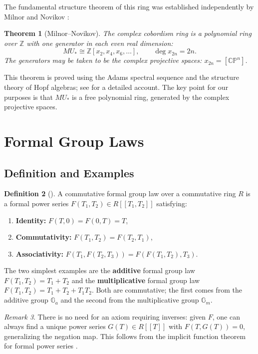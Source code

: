 \documentclass[12pt]{article}
\newtheorem{theorem}{Theorem}[section]
\theoremstyle{definition}
\newtheorem{definition}[theorem]{Definition}
\theoremstyle{remark}
\newtheorem{remark}[theorem]{Remark}
\newcommand{\Z}{\mathbb{Z}}
\newcommand{\CP}{\mathbb{CP}}
\newcommand{\MU}{MU_*}
\begin{document}
The fundamental structure theorem of this ring was established independently by Milnor \cite{Mil60} and Novikov \cite{Nov60, Nov67}:

\begin{theorem}[Milnor--Novikov]\label{thm:milnor-novikov}
The complex cobordism ring is a polynomial ring over $\Z$ with one generator in each even real dimension:
\[
  \MU \cong \Z[x_2, x_4, x_6, \ldots], \qquad \deg x_{2n} = 2n.
\]
The generators may be taken to be the complex projective spaces: $x_{2n} = [\CP^n]$.
\end{theorem}

This theorem is proved using the Adams spectral sequence \cite{Adams58} and the structure theory of Hopf algebras; see \cite{Pan11} for a detailed account. The key point for our purposes is that $\MU$ is a free polynomial ring, generated by the complex projective spaces.

\section{Formal Group Laws}\label{sec:fgl}

\subsection{Definition and Examples}

\begin{definition}[{\cite{Laz55}}]
A commutative formal group law over a commutative ring $R$ is a formal power series $F(T_1, T_2) \in R[[T_1, T_2]]$ satisfying:
\begin{enumerate}
  \item \textbf{Identity:} $F(T, 0) = F(0, T) = T$,
  \item \textbf{Commutativity:} $F(T_1, T_2) = F(T_2, T_1)$,
  \item \textbf{Associativity:} $F(T_1, F(T_2, T_3)) = F(F(T_1, T_2), T_3)$.
\end{enumerate}
\end{definition}

The two simplest examples are the \textbf{additive} formal group law $F(T_1, T_2) = T_1 + T_2$ and the \textbf{multiplicative} formal group law $F(T_1, T_2) = T_1 + T_2 + T_1 T_2$. Both are commutative; the first comes from the additive group $\mathbb{G}_a$ and the second from the multiplicative group $\mathbb{G}_m$.

\begin{remark}
There is no need for an axiom requiring inverses: given $F$, one can always find a unique power series $G(T) \in R[[T]]$ with $F(T, G(T)) = 0$, generalizing the negation map. This follows from the implicit function theorem for formal power series \cite{Silverman09, WFG25}.
\end{remark}
\end{document}
